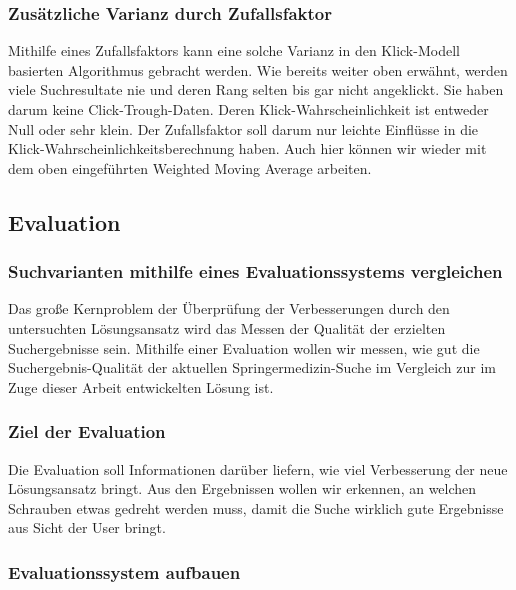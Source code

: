 \subsubsection{Zusätzliche Varianz durch Zufallsfaktor}
\label{sec:Einfuehrung:Methodik:Userrelevanz:Zufallsfaktor}

Mithilfe eines Zufallsfaktors kann eine solche Varianz in den Klick-Modell basierten Algorithmus gebracht werden. Wie bereits weiter oben erwähnt, werden viele Suchresultate nie und deren Rang selten bis gar nicht angeklickt. Sie haben darum keine Click-Trough-Daten. Deren Klick-Wahrscheinlichkeit ist entweder Null oder sehr klein. Der Zufallsfaktor soll darum nur leichte Einflüsse in die Klick-Wahrscheinlichkeitsberechnung haben. Auch hier können wir wieder mit dem oben eingeführten \glqq Weighted Moving Average\grqq{}\cite{weightedAVG} arbeiten.

\subsection{Evaluation}
\label{sec:Einfuehrung:Methodik:Evaluation}

\subsubsection{Suchvarianten mithilfe eines Evaluationssystems vergleichen}
\label{sec:Einfuehrung:Methodik:Evaluation:Ziel}

Das große Kernproblem der Überprüfung der Verbesserungen durch den untersuchten Lösungsansatz wird das Messen der Qualität der erzielten Suchergebnisse sein. Mithilfe einer Evaluation wollen wir messen, wie gut die Suchergebnis-Qualität der aktuellen Springermedizin-Suche im Vergleich zur im Zuge dieser Arbeit entwickelten Lösung ist.

\subsubsection{Ziel der Evaluation}
\label{sec:Einfuehrung:Methodik:Evaluation:Ziel}

Die Evaluation soll Informationen darüber liefern, wie viel Verbesserung der neue Lösungsansatz bringt. Aus den Ergebnissen wollen wir erkennen, an welchen \glqq Schrauben\grqq{} etwas gedreht werden muss, damit die Suche wirklich gute Ergebnisse aus Sicht der User bringt.

\subsubsection{Evaluationssystem aufbauen}
\label{sec:Einfuehrung:Methodik:Evaluation:Aufbau}

